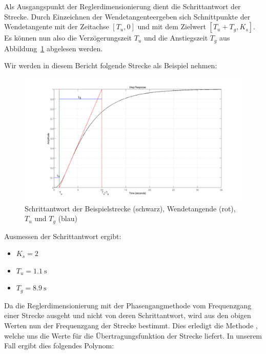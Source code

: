 Als  Ausgangspunkt  der  Reglerdimensionierung dient  die  Schrittantwort  der
Strecke. Durch  Einzeichnen  der  Wendetangente\footnotemark[1]  ergeben  sich
Schnittpunkte  der  Wendetangente mit  der  Zeitachse  $[T_u,0]$ und  mit  dem
Zielwert $[T_u+T_g,K_s]$.   Es k\"onnen nun also  die Verz\"ogerungszeit $T_u$
und  die  Anstiegszeit   $T_g$  aus  Abbildung~\ref{fig:plant_step}  abgelesen
werden.


Wir werden in diesem Bericht folgende Strecke als Beispiel nehmen:
\begin{figure}[h! width=\pagewidth]
    \includegraphics[width=\textwidth]{images/streckeSchrittantwort.png}
    \caption{%
    Schrittantwort der  Beispielstrecke (schwarz), Wendetangende  (rot), $T_u$
    und $T_g$ (blau)
    }
    \label{fig:plant_step}
\end{figure}

Ausmessen der Schrittantwort ergibt:
\begin{itemize}
    \item
        $K_s = 2$\footnotemark[2]
    \item
        $T_u = \SI{1.1}{\second}$
    \item
        $T_g = \SI{8.9}{\second}$
\end{itemize}


Da  die  Reglerdimensionierung  mit  der  Phasengangmethode  vom  Frequenzgang
einer  Strecke  ausgeht und  nicht  von  deren  Schrittantwort, wird  aus  den
obigen Werten  nun der Frequenzgang  der Strecke bestimmt.  Dies  erledigt die
Methode  \footnotemark[3],  welche  uns die  Werte  f\"ur  die
\"Ubertragungsfunktion  der  Strecke liefert.   In  unserem  Fall ergibt  dies
folgendes Polynom:

